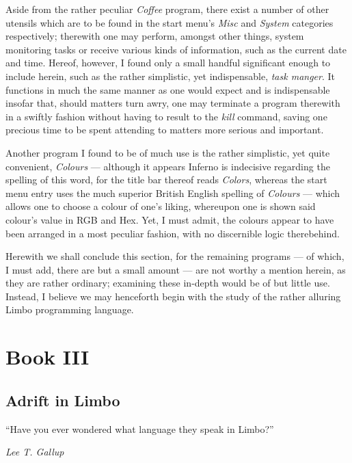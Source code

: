 \documentclass[a5paper,twoside,12pt]{report}
\begin{document}
  Aside from the rather peculiar \textit{Coffee} program, there exist a number of other utensils which are to be found in the start menu's \textit{Misc} and \textit{System} categories respectively; therewith one may perform, amongst other things, system monitoring tasks or receive various kinds of information, such as the current date and time. Hereof, however, I found only a small handful significant enough to include herein, such as the rather simplistic, yet indispensable, \textit{task manger}. It functions in much the same manner as one would expect and is indispensable insofar that, should matters turn awry, one may terminate a program therewith in a swiftly fashion without having to result to the \textit{kill} command, saving one precious time to be spent attending to matters more serious and important.
  
  Another program I found to be of much use is the rather simplistic, yet quite convenient, \textit{Colours} — although it appears Inferno is indecisive regarding the spelling of this word, for the title bar thereof reads \textit{Colors}, whereas the start menu entry uses the much superior British English spelling of \textit{Colours} — which allows one to choose a colour of one's liking, whereupon one is shown said colour's value in RGB and Hex. Yet, I must admit, the colours appear to have been arranged in a most peculiar fashion, with no discernible logic therebehind.

  Herewith we shall conclude this section, for the remaining programs — of which, I must add, there are but a small amount — are not worthy a mention herein, as they are rather ordinary; examining these in-depth would be of but little use. Instead, I believe we may henceforth begin with the study  of the rather alluring Limbo programming language.  \newpage

\part*{Book III}
  \newpage

\thispagestyle{empty}
  \mbox{}
  \newpage

\chapter*{Adrift in Limbo}

\epigraph{``Have you ever wondered what language they speak in Limbo?''}{\textit{Lee T. Gallup}}
\end{document}
